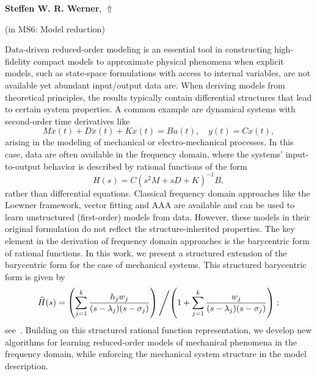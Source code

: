 \documentclass[ILAS2025-program.tex]{subfiles}
\begin{document}
\hypertarget{down0166}{}\begin{ilasabstract}
    
\textbf{Steffen W. R. Werner},  \hfill \hyperlink{up0166}{$\Uparrow$}
    
    
(in {\color{mstitle}MS6: Model reduction})
        
\mtskip
    \begin{bibunit}
        Data-driven reduced-order modeling is an essential tool in constructing
high-fidelity compact models to approximate physical phenomena when explicit
models, such as state-space formulations with access to internal variables, are
not available yet abundant input/output data are.
When deriving models from theoretical principles, the results
typically contain differential structures that lead to certain system
properties.
A common example are dynamical systems with second-order time derivatives
like
\begin{equation*}
  M \ddot{x}(t) + D \dot{x}(t) + K x(t) = B u(t), \quad
  y(t) = C x(t),
\end{equation*}
arising in the modeling of mechanical or electro-mechanical processes.
In this case, data are often available in the frequency domain, where the
systems' input-to-output behavior is described by rational functions
of the form
\begin{equation*}
  H(s) = C (s^{2} M + s D + K)^{-1} B,
\end{equation*}
rather than differential equations.
Classical frequency domain approaches like the Loewner framework, vector
fitting and AAA are available and can be used to learn unstructured
(first-order) models from data.
However, these models in their original formulation do not reflect the
structure-inherited properties.
The key element in the derivation of frequency domain approaches is the
barycentric form of rational functions.
In this work, we present a structured extension of the barycentric form for the
case of mechanical systems.
This structured barycentric form is given by
\begin{equation*}
  \widehat{H}(s) = \left(\sum_{j = 1}^k\frac{h_{j} w_{j}}{(s - \lambda_{j})
    (s - \sigma_{j})} \right) \left/ \left(1 + \sum_{j = 1}^{k}
    \frac{w_{j}}{(s - \lambda_{j})(s - \sigma_{j})}\right)\right.;
\end{equation*}
see~\cite{WernerSWR_GosGW24}.
Building on this structured rational function representation, we develop new
algorithms for learning reduced-order models of mechanical phenomena in the
frequency domain, while enforcing the mechanical system structure in the model
description.


\end{bibunit}
\end{ilasabstract}
\end{document}
